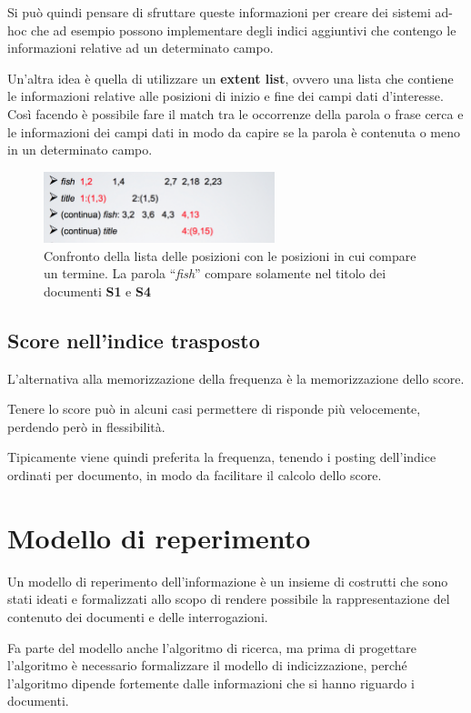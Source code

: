 Si può quindi pensare di sfruttare queste informazioni per creare dei sistemi ad-hoc che ad esempio possono implementare degli indici aggiuntivi che contengo le informazioni relative ad un determinato campo.

Un'altra idea è quella di utilizzare un \textbf{extent list}, ovvero una lista che contiene le informazioni relative alle posizioni di inizio e fine dei campi dati d'interesse.
Così facendo è possibile fare il match tra le occorrenze della parola o frase cerca e le informazioni dei campi dati in modo da capire se la parola è contenuta o meno in un determinato campo.

\begin{figure}[htbp]
	\centering
	\includegraphics[width=0.6\textwidth]{./images/l7-titoli}
	\caption{Confronto della lista delle posizioni con le posizioni in cui compare un termine. La parola ``\textit{fish}'' compare solamente nel titolo dei documenti \textbf{S1} e \textbf{S4}}
\end{figure}

\subsection{Score nell'indice trasposto}

L'alternativa alla memorizzazione della frequenza è la memorizzazione dello score. 

Tenere lo score può in alcuni casi permettere di risponde più velocemente, perdendo però in flessibilità.

Tipicamente viene quindi preferita la frequenza, tenendo i posting dell'indice ordinati per documento, in modo da facilitare il calcolo dello score.

\section{Modello di reperimento}

Un modello di reperimento dell'informazione è un insieme di costrutti che sono stati ideati e formalizzati allo scopo di rendere possibile la rappresentazione del contenuto dei documenti e delle interrogazioni.

Fa parte del modello anche l'algoritmo di ricerca, ma prima di progettare l'algoritmo è necessario formalizzare il modello di indicizzazione, perché l'algoritmo dipende fortemente dalle informazioni che si hanno riguardo i documenti.

